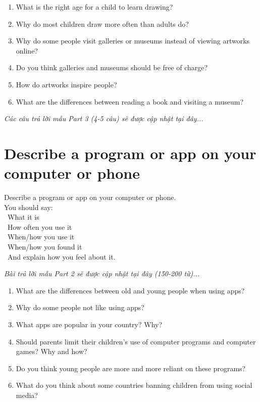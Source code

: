 \begin{ieltsprompt}
\begin{enumerate}[itemsep=4pt]
    \item What is the right age for a child to learn drawing?
    \item Why do most children draw more often than adults do?
    \item Why do some people visit galleries or museums instead of viewing artworks online?
    \item Do you think galleries and museums should be free of charge?
    \item How do artworks inspire people?
    \item What are the differences between reading a book and visiting a museum?
\end{enumerate}
\end{ieltsprompt}

\vspace{1em}
\textit{Các câu trả lời mẫu Part 3 (4-5 câu) sẽ được cập nhật tại đây...}
\vspace{2em}

\section{Describe a program or app on your computer or phone}
\begin{ieltsprompt}
Describe a program or app on your computer or phone. \\
You should say: \\
\textbullet\ What it is \\
\textbullet\ How often you use it \\
\textbullet\ When/how you use it \\
\textbullet\ When/how you found it \\
\textbullet\ And explain how you feel about it. \\
\end{ieltsprompt}

\vspace{1em}
\textit{Bài trả lời mẫu Part 2 sẽ được cập nhật tại đây (150-200 từ)...}
\vspace{2em}

\begin{ieltsprompt}
\begin{enumerate}[itemsep=4pt]
    \item What are the differences between old and young people when using apps?
    \item Why do some people not like using apps?
    \item What apps are popular in your country? Why?
    \item Should parents limit their children's use of computer programs and computer games? Why and how?
    \item Do you think young people are more and more reliant on these programs?
    \item What do you think about some countries banning children from using social media?
\end{enumerate}
\end{ieltsprompt}

